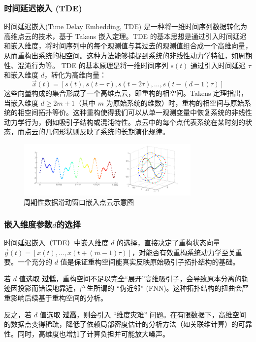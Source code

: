 \subsubsection{时间延迟嵌入 (TDE)}
时间延迟嵌入(Time Delay Embedding, TDE) 是一种将一维时间序列数据转化为高维点云的技术，基于 Takens 嵌入定理。TDE 的基本思想是通过引入时间延迟和嵌入维度，将时间序列中的每个观测值与其过去的观测值组合成一个高维向量，从而重构出系统的相空间。这种方法能够捕捉到系统的非线性动力学特征，如周期性、混沌行为等。
TDE 的基本原理是将一维时间序列 \( s(t) \) 通过引入时间延迟 \( \tau \) 和嵌入维度 \( d \)，转化为高维向量：
\begin{equation}
    \vec{x}(t) = \left[ s(t), s(t - \tau), s(t - 2\tau), \dots, s(t - (d - 1)\tau) \right]
\end{equation}
这些向量构成的集合形成了一个高维点云，即重构的相空间。Takens 定理指出，当嵌入维度 \( d \geq 2m + 1 \)（其中 \( m \) 为原始系统的维数）时，重构的相空间与原始系统的相空间拓扑等价。这种重构使得我们可以从单一观测变量中恢复系统的非线性动力学行为，例如吸引子结构或混沌特性。点云中的每个点代表系统在某时刻的状态，而点云的几何形状则反映了系统的长期演化规律。
\begin{figure}[thbp!]
    \centering
    \includegraphics[width=0.8\textwidth]{figure/滑动窗口嵌入示意图、.png}
    \caption{周期性数据滑动窗口嵌入点云示意图}
\end{figure}



\subsubsection{嵌入维度参数\(d\)的选择}
时间延迟嵌入（TDE）中嵌入维度 $d$ 的选择，直接决定了重构状态向量 $\vec{y}(t) = [x(t), \dots, x(t+(m-1)\tau)]$，对能否有效重构系统动力学至关重要。一个充分的 $d$ 值是保证重构空间能真实反映原始吸引子拓扑结构的基础。

若 $d$ 值选取 \textbf{过低}，重构空间不足以完全“展开”高维吸引子，会导致原本分离的轨迹因投影而错误地靠近，产生所谓的 “伪近邻” (FNN)。这种拓扑结构的扭曲会严重影响后续基于重构空间的分析。

反之，若 $d$ 值选取 \textbf{过高}，则会引入 “维度灾难” 问题。在有限数据下，高维空间的数据点变得稀疏，降低了依赖局部密度估计的分析方法（如关联维计算）的可靠性。同时，高维度也增加了计算负担并可能放大噪声。

